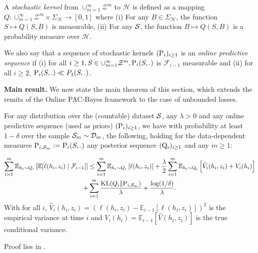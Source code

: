 A \emph{stochastic kernel} from $\cup_{m=1}^\infty\mathcal{Z}^m$ to $\mathcal{H}$ is defined as a mapping $Q: \cup_{m=1}^\infty\mathcal{Z}^m\times \Sigma_{\mathcal{H}} \rightarrow [0,1]$ where
(i) For any $B\in \Sigma_{\mathcal{H}}$, the function  $S\mapsto Q(S,B)$ is measurable,  (ii) For any $\S$, the function $B\mapsto Q(S,B)$ is a probability measure over $\mathcal{H}$.


We also say that a sequence of stochastic kernels $(\P_{i})_{i\geq 1}$ is an \emph{online predictive sequence} if (i) for all $i\geq 1, S\in\cup_{m=1}^\infty\mathcal{Z}^m, \P_{i}(S,.)$ is $\mathcal{F}_{i-1}$ measurable and (ii) for all $i \geq 2$, $\P_{i}(S,.)\ll P_{1}(S,.)$.

\textbf{Main result.} We now state the main theorem of this section, which extends the remits of the Online PAC-Bayes framework to the case of unbounded losses.

\begin{theorem}
  \label{th: main_thm_onl}
  For any distribution over the (countable) dataset $\S$, any $\lambda>0$ and any online predictive sequence (used as priors) $(\P_{i})_{i\geq 1}$, we have with probability at least $1-\delta$ over the sample $\Sm\sim\Dm$, the following, holding for the data-dependent measures $\P_{i,\Sm}:= \P_{i}(S,.)$ any posterior sequence $(\Q_{i})_{i\geq 1}$ and any $m\geq 1$:

  \begin{multline*}
     \sum_{i=1}^m \mathbb{E}_{h_i\sim Q_{i}}\left[ \mathbb{E}[\ell(h_i,z_i) \mid \mathcal{F}_{i-1}]    \right]  \leq \sum_{i=1}^m \mathbb{E}_{h_i\sim Q_{i}}\left[ \ell(h_i,z_i) \right] +\frac{\lambda}{2}\sum_{i=1}^m \mathbb{E}_{h_i\sim \Q_{i}}\left[ \hat{V}_i(h_i,z_i) + V_i(h_i) \right] \\
     + \sum_{i=1}^m\frac{\operatorname{KL}(Q_{i}\| \P_{i,\Sm})}{\lambda}  + \frac{\log(1/\delta)}{\lambda}.
  \end{multline*}
  With for all $i$, $\hat{V}_i(h_i,z_i)= (\ell(h_i,z_i)-\mathbb{E}_{i-1}[\ell(h_i,z_i)])^2$ is the empirical variance at time $i$ and $V_i(h_i)= \mathbb{E}_{i-1}[\hat{V}(h_i,z_i)]$ is the true conditional variance.
\end{theorem}

Proof lies in .

